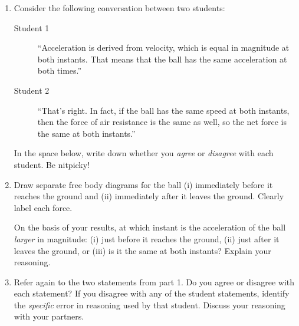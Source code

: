 \documentclass[12pt,hidelinks]{article}
\begin{document}
\begin{enumerate}
\begin{center}
  \end{center}
  \begin{enumerate}[label=\arabic*.]
    \item Consider the following conversation between two students:
    \begin{description}
      \item[Student 1] ``Acceleration is derived from velocity, which is equal in magnitude at
      both instants.  That means that the ball has the same acceleration at both times.''
      \item[Student 2] ``That's right. In fact, if the ball has the same speed at both
      instants, then the force of air resistance is the same as well, so the net force is the
      same at both instants.''
    \end{description}
    In the space below, write down whether you \textit{agree} or \textit{disagree} with each
    student. Be nitpicky! \vfill
    \item Draw separate free body diagrams for the ball (i) immediately before it reaches the
    ground and (ii) immediately after it leaves the ground.  Clearly label each force. \vfill

    On the basis of your results, at which instant is the acceleration of the ball
    \textit{larger} in magnitude: (i) just before it reaches the ground, (ii) just after it
    leaves the ground, or (iii) is it the same at both instants?  Explain your
    reasoning. \vfill
    \item Refer again to the two statements from part 1.  Do you agree or disagree with each
    statement?  If you disagree with any of the student statements, identify the
    \textit{specific} error in reasoning used by that student.  Discuss your reasoning with
    your partners. \vfill
  \end{enumerate}
\end{enumerate}
\end{document}
